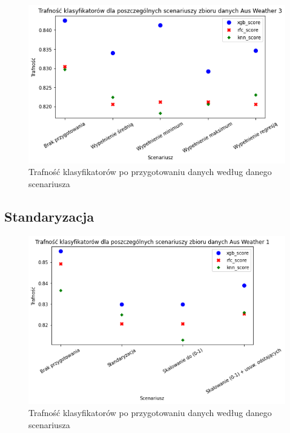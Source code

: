 \documentclass{book}
\begin{document}
\begin{figure}[H]
\centerline{\includegraphics[scale=0.5]{Aus_Weather_3_Wypełnienie_brakujących}}
\centering
\caption{Trafność klasyfikatorów po przygotowaniu danych 
według danego scenariusza}
\end{figure}

\subsection{Standaryzacja}

\begin{figure}[H]
\centerline{\includegraphics[scale=0.5]{Aus_Weather_1_Standaryzacja}}
\centering
\caption{Trafność klasyfikatorów po przygotowaniu danych 
według danego scenariusza}
\end{figure}
\end{document}

